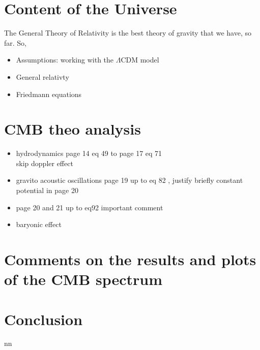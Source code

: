 \documentclass{article}
\begin{document}
\section{Content of the Universe}
The General Theory of Relativity is the best theory of gravity that we have, so far. So,  
\begin{itemize}
\item Assumptions: working with the $\Lambda$CDM model
\item General relativty
\item Friedmann equations
\end{itemize}

\section{CMB theo analysis}
\begin{itemize}
\item hydrodynamics \citep{huLectureNotesCMB2008}
page 14 eq 49 to page 17 eq 71\\
skip doppler effect
\item gravito acoustic oscillations page 19 up to eq 82 , justify briefly constant potential in page 20
\item page 20 and 21 up to eq92 important comment 
\item baryonic effect
\end{itemize}

\section{Comments on the results and plots of the CMB spectrum}







\section{Conclusion}
nn
\citep{padmanabhanDetectingDarkMatter2005}





\end{document}
